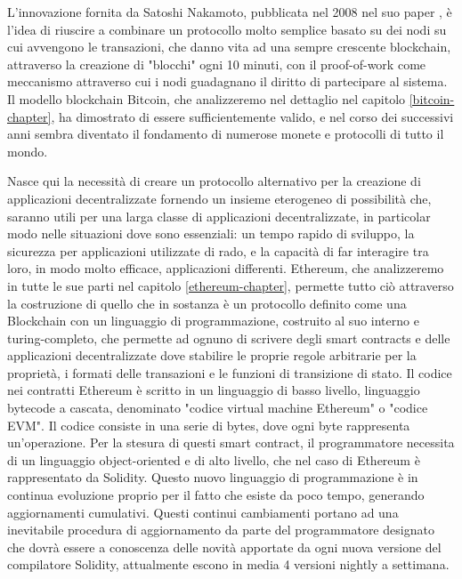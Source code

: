 L'innovazione fornita da Satoshi Nakamoto, pubblicata nel 2008 nel suo paper \cite{paper-bitcoin:satoshi}, è l'idea di riuscire a combinare un protocollo molto semplice basato su dei nodi su cui avvengono le transazioni, che danno vita ad una sempre crescente blockchain, attraverso la creazione di "blocchi" ogni 10 minuti, con il proof-of-work come meccanismo attraverso cui i nodi guadagnano il diritto di partecipare al sistema. Il modello blockchain Bitcoin, che analizzeremo nel dettaglio nel capitolo \ref{bitcoin-chapter}, ha dimostrato di essere sufficientemente valido, e nel corso dei successivi anni sembra diventato il fondamento di numerose monete e protocolli di tutto il mondo. 

Nasce qui la necessità di creare un protocollo alternativo per la creazione di applicazioni decentralizzate fornendo un insieme eterogeneo di possibilità che, saranno utili per una larga classe di applicazioni decentralizzate, in particolar modo nelle situazioni dove sono essenziali: un tempo rapido di sviluppo, la sicurezza per applicazioni utilizzate di rado, e la capacità di far interagire tra loro, in modo molto efficace, applicazioni differenti. Ethereum, che analizzeremo in tutte le sue parti nel capitolo \ref{ethereum-chapter}, permette tutto ciò attraverso la costruzione di quello che in sostanza è un protocollo definito come una Blockchain con un linguaggio di programmazione, costruito al suo interno e turing-completo, che permette ad ognuno di scrivere degli smart contracts e delle applicazioni decentralizzate dove stabilire le proprie regole arbitrarie per la proprietà, i formati delle transazioni e le funzioni di transizione di stato. Il codice nei contratti Ethereum è scritto in un linguaggio di basso livello, linguaggio bytecode a cascata, denominato "codice virtual machine Ethereum" o "codice EVM". Il codice consiste in una serie di bytes, dove ogni byte rappresenta un'operazione. Per la stesura di questi smart contract, il programmatore necessita di un linguaggio object-oriented e di alto livello, che nel caso di Ethereum è rappresentato da Solidity. Questo nuovo linguaggio di programmazione è in continua evoluzione proprio per il fatto che esiste da poco tempo, generando aggiornamenti cumulativi. Questi continui cambiamenti portano ad una inevitabile procedura di aggiornamento da parte del programmatore designato che dovrà essere a conoscenza delle novità apportate da ogni nuova versione del compilatore Solidity, attualmente escono in media 4 versioni nightly a settimana. 

